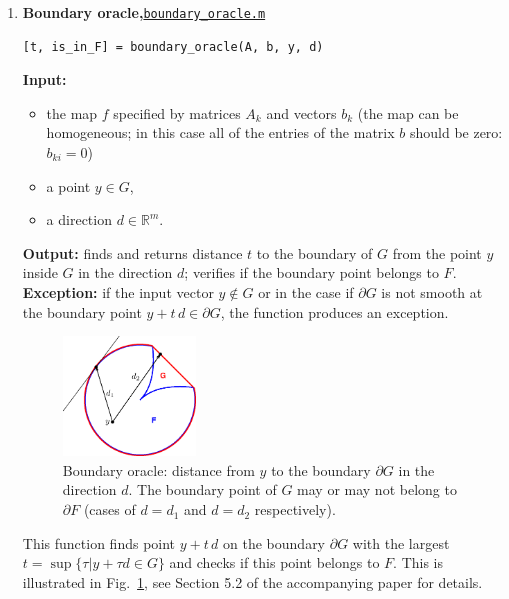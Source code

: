 \documentclass[a4paper]{article}
\newcommand{\R}{\mathbb{R}}
\theoremstyle{definition}
\begin{document}
\begin{enumerate}
The function returns {\tt is\_infeasible=1} if the desired hyperplane was found.
In this case $y\notin G$ and consequently $y\notin F$, implying there is no $x\in \mathbb{V}$ such that $y=f(x)$, i.e.~this point is infeasible.
If the hyperplane was not found the function returns {\tt is\_infeasible=0}, which means $y$ does belong to $G$ but the feasibility  of $y$ with respect to $F$ is uncertain.
\newpage
\item {\bf Boundary oracle,\hskip 6pt}\underline{\tt boundary\_oracle.m}
\begin{verbatim}
[t, is_in_F] = boundary_oracle(A, b, y, d)
\end{verbatim}
{\bf Input:}
\begin{itemize}
	\item the map $f$ specified by matrices $A_k$ and vectors $b_k$ (the map can be homogeneous; in this case all of the entries of the matrix $b$ should be zero: $b_{ki}=0$)
	\item a point $y\in G$,
	\item a direction $d\in\R^m$.
\end{itemize}
{\bf Output:}  finds and returns distance $t$ to the boundary of $G$ from the point $y$ inside $G$ in the direction $d$; verifies if the boundary point belongs to $F$.\\
{\bf Exception:}  if the input vector $y\notin G$ or in the case if $\partial G$ is not smooth at the boundary point $y+t\,d\in \partial G$, the function produces an exception.


\begin{figure}[H]
	\centering\includegraphics[width=100pt]{fig/boundary_oracle}
\captionsetup{width=.8\linewidth}
	\caption{Boundary oracle: distance from $y$ to the boundary $\partial G$ in the direction $d$.
	The boundary point of $G$ may or may not belong to $\partial F$ (cases of $d=d_1$ and $d=d_2$ respectively).}
\label{fig:two}
\end{figure}


This function finds point $y+t\,d$ on the boundary $\partial G$ with the largest $ {t} = \sup\{\tau\big| y+\tau d\in G\}$ and checks if this point belongs to $F$. 
This is illustrated in Fig.~\ref{fig:two}, see Section 5.2 of the accompanying paper for details.


\end{enumerate}
\end{document}
